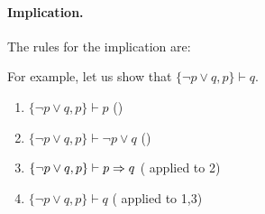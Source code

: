 \paragraph{Implication.}

The rules for the implication are:

\begin{prooftree}
\end{prooftree}

\begin{prooftree}
\end{prooftree}

\begin{prooftree}
\end{prooftree}

\begin{prooftree}
\end{prooftree}

For example, let us show that $\{\neg p\vee q,p\}\vdash q$.
\begin{enumerate}
	\item $\{\neg p\vee q, p\}\vdash p$ \hfill ()
	\item $\{\neg p\vee q, p\}\vdash \neg p\vee q$ \hfill ()
	\item $\{\neg p\vee q, p\}\vdash p\imp q$ \hfill ( applied to 2)
	\item $\{\neg p\vee q, p\}\vdash q$ \hfill ( applied to 1,3)
\end{enumerate}

